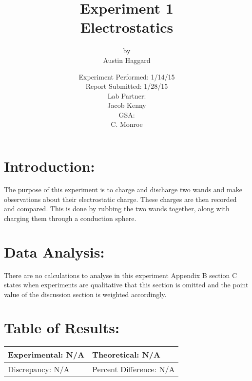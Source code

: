 \documentclass{article}
\title{Experiment 1 \\ Electrostatics}
\author{by \\ Austin Haggard}
\date{
	Experiment Performed: 1/14/15 \\
	Report Submitted: 1/28/15 \\[11pt]
	Lab Partner: \\ Jacob Kenny \\[11pt] 
	GSA: \\ C. Monroe
}
\begin{document}
\maketitle
\thispagestyle{empty}
\newpage

\section*{Introduction:}
\setcounter{page}{1}
The purpose of this experiment is to charge and discharge two wands and make observations about their electrostatic charge.  These charges are then recorded and compared.  This is done by rubbing the two wands together, along with charging them through a conduction sphere. 
\newpage


\section*{Data Analysis:}
\setcounter{page}{3}
There are no calculations to analyse in this experiment  Appendix B section C states when experiments are qualitative that this section is omitted and the point value of the discussion section is weighted accordingly.
\newpage

\section*{Table of Results:}
\begin{center}
\begin{tabular}{|l|l|}
\hline
	Experimental: N/A & Theoretical: N/A  \\ \hline
	Discrepancy: N/A   & Percent Difference: N/A \\
\hline
\end{tabular}
\end{center}
\end{document}
